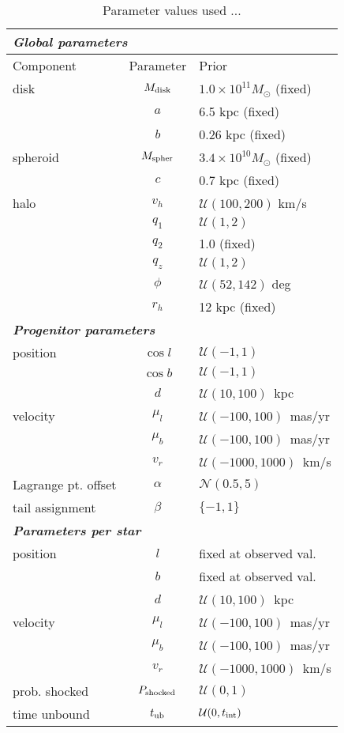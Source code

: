 \documentclass[letterpaper,12pt,preprint]{aastex}
\newcommand{\tub}{t_{\rm ub}}
\newcommand{\tint}{t_{\rm int}}
\begin{document}
\begin{table}[h]
\begin{center}
	\begin{tabular}{l c l} \toprule
		\multicolumn{3}{l}{{\bf \emph{Global parameters}}} \\
		\toprule
		Component & Parameter & Prior \\\toprule
		disk & $M_{\rm disk}$ & $1.0\times10^{11}M_\odot$ (fixed) \\ 
		& $a$ & 6.5 kpc (fixed)\\
		& $b$ & 0.26 kpc (fixed)\\
		\midrule
		spheroid & $M_{\rm spher}$ & $3.4\times10^{10}M_\odot$ (fixed)\\ 
		& $c$ & 0.7 kpc (fixed)\\
		\midrule
		halo & $v_h$ & $\mathcal{U}(100,200)$ km/s \\
		& $q_1$ & $\mathcal{U}(1,2)$\\
		& $q_2$ & 1.0 (fixed)\\
		& $q_z$ & $\mathcal{U}(1,2)$\\
		& $\phi$ & $\mathcal{U}(52,142)$ deg\\
		& $r_h$ & 12 kpc (fixed)\\
		\toprule
		\multicolumn{3}{l}{{\bf \emph{Progenitor parameters}}} \\
		\toprule
		position & $\cos l$ & $\mathcal{U}(-1,1)$ \\
		& $\cos b$ & $\mathcal{U}(-1,1)$\\
		& $d$ & $\mathcal{U}(10,100)$~kpc\\
		velocity & $\mu_l$ & $\mathcal{U}(-100,100)$~mas/yr\\
		& $\mu_b$ & $\mathcal{U}(-100,100)$~mas/yr\\
		& $v_r$ & $\mathcal{U}(-1000,1000)$~km/s\\
		Lagrange pt. offset & $\alpha$ & $\mathcal{N}(0.5,5)$\\
		tail assignment & $\beta$ & $\{-1, 1\}$\\ %
		\toprule
		\multicolumn{3}{l}{{\bf \emph{Parameters per star}}} \\
		\toprule
		position & $l$ & fixed at observed val.\\
		& $b$ & fixed at observed val.\\
		& $d$ & $\mathcal{U}(10,100)$~kpc\\
		velocity & $\mu_l$ & $\mathcal{U}(-100,100)$~mas/yr\\
		& $\mu_b$ & $\mathcal{U}(-100,100)$~mas/yr\\
		& $v_r$ & $\mathcal{U}(-1000,1000)$~km/s\\
		prob. shocked & $P_{\rm shocked}$ & $\mathcal{U}(0,1)$\\
		time unbound & $\tub$ & $\mathcal{U}(0,\tint)$\\ %
		\bottomrule
		\end{tabular}
	\caption{Parameter values used ...\label{tbl:params}}
\end{center}
\end{table}
\end{document}
